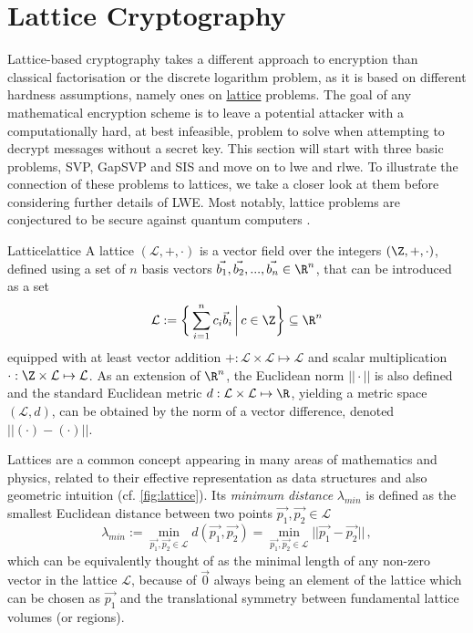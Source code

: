 \section{Lattice Cryptography}
\label{subsec:lattice-crypto}
Lattice-based cryptography takes a different approach to encryption than classical factorisation or the discrete logarithm problem, as it is based on different hardness assumptions, namely ones on \hyperref[def:lattice]{lattice} problems.
The goal of any mathematical encryption scheme is to leave a potential attacker with a computationally hard, at best infeasible, problem to solve when attempting to decrypt messages without a secret key.
This section will start with three basic problems, SVP, GapSVP and SIS and move on to \gls{lwe} and \gls{rlwe}.
To illustrate the connection of these problems to lattices, we take a closer look at them before considering further details of LWE.
Most notably, lattice problems are conjectured to be secure against quantum computers \parencite{2018-lattice-problems}.

\newcommand{\lat}{\mathcal{L}}
\begin{definition}{Lattice}{lattice}
  A lattice $(\lat, +, \cdot)$ is a vector field over the integers $(\Z, +, \cdot)$, defined using a set of $n$ basis vectors $\vec{b_1}, \vec{b_2}, ..., \vec{b_n} \in \R^n$, that can be introduced as a set
  $$\lat := \bigg\{\sum_{i=1}^n c_i \vec{b}_i \,\bigg|\, c \in \Z\bigg\} \subseteq \R^n$$
  equipped with at least vector addition $+: \lat \times \lat \mapsto \lat$ and scalar multiplication $\cdot: \Z \times \lat \mapsto \lat$.
  As an extension of $\R^n$, the Euclidean norm $||\cdot||$ is also defined and the standard Euclidean metric $d: \lat \times \lat \mapsto \R$, yielding a metric space $(\lat, d)$, can be obtained by the norm of a vector difference, denoted $||(\cdot) - (\cdot)||$.
\end{definition}

Lattices are a common concept appearing in many areas of mathematics and physics, related to their effective representation as data structures and also geometric intuition (cf. \cref{fig:lattice}).
Its \textit{minimum distance} $\lambda_{min}$ is defined as the smallest Euclidean distance between two points $\vec{p_1}, \vec{p_2} \in \lat$
$$\lambda_{min} := \min_{\vec{p_1}, \vec{p_2} \in \lat} d(\vec{p_1}, \vec{p_2}) =
  \min_{\vec{p_1}, \vec{p_2} \in \lat} ||\vec{p_1} - \vec{p_2}|| \,,$$
which can be equivalently thought of as the minimal length of any non-zero vector in the lattice $\lat$, because of $\vec{0}$ always being an element of the lattice which can be chosen as $\vec{p_1}$ and the translational symmetry between fundamental lattice volumes (or regions).

